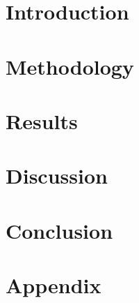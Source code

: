 \documentclass[11pt]{article}
\begin{document}


\newpage
\tableofcontents

\newpage
\section{Introduction}


\section{Methodology}


\section{Results}


\section{Discussion}


\section{Conclusion}


\section{Appendix}


\newpage

\end{document}
